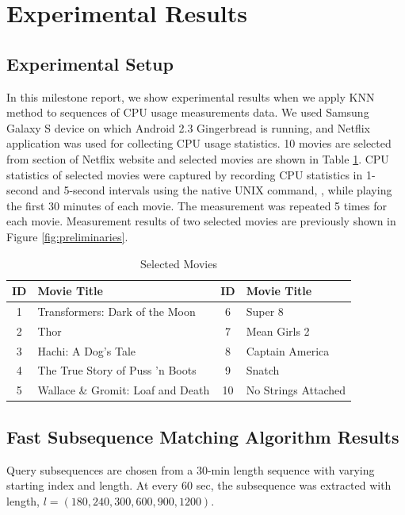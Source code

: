 \section{Experimental Results}
\label{sec:experiments}

\subsection{Experimental Setup}


In this milestone report, we show experimental results when we apply KNN method to sequences of CPU usage measurements data.
We used Samsung Galaxy S device on which Android 2.3 Gingerbread is running, and Netflix application was used for collecting CPU usage statistics.
10 movies are selected from  section of Netflix website and selected movies are shown in Table \ref{tab:movies}.
CPU statistics of selected movies were captured by recording CPU statistics in 1-second and 5-second intervals using the native UNIX command, , while playing the first 30 minutes of each movie. 
The measurement was repeated 5 times for each movie.
Measurement results of two selected movies are previously shown in Figure \ref{fig:preliminaries}.

\begin{table}[h!]
\begin{center}
\begin{tabular}{|c|l|c|l|}
\hline
ID & Movie Title & ID & Movie Title \\ 
\hline
1 & Transformers: Dark of the Moon 		& 6 & Super 8\\
2 & Thor								& 7 & Mean Girls 2 \\
3 & Hachi: A Dog's Tale 					& 8 & Captain America \\
4 & The True Story of Puss 'n Boots 		& 9 &  Snatch \\
5 & Wallace \& Gromit: Loaf and Death 		& 10 & No Strings Attached \\
\hline
\end{tabular}
\end{center}
\caption{Selected Movies}
\label{tab:movies}
\end{table}

\subsection{Fast Subsequence Matching Algorithm Results}
Query subsequences are chosen from a 30-min length sequence with varying starting index and length. At every 60 sec, the subsequence was extracted with length, $l = (180, 240, 300, 600, 900, 1200)$. 

